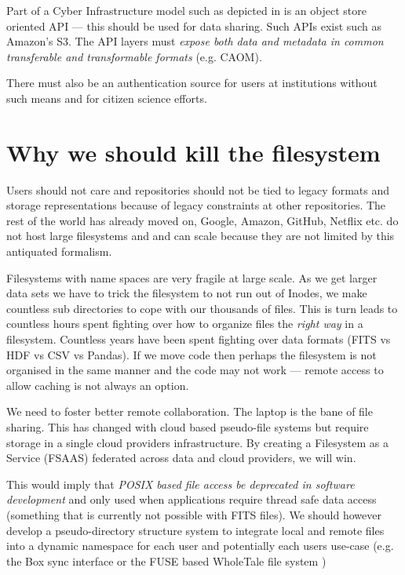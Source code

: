 Part of a Cyber Infrastructure model such as depicted in  is an object store oriented \gls{API} --- this should be used for data sharing. Such APIs exist such as Amazon's S3.
The  \gls{API} layers must \emph{expose both data and \gls{metadata} in common
transferable and transformable formats} (e.g. \gls{CAOM}).


There must also be an authentication source for users at institutions without such means and for citizen science efforts.

\section{Why we should kill the filesystem}

Users should not care and repositories should not be tied to legacy formats  and storage representations because of legacy constraints  at other repositories.
The rest of the world has already moved on,  Google, Amazon, GitHub, Netflix etc. do not host large filesystems and and can scale because they are not limited by this antiquated formalism.

Filesystems with name spaces are very fragile at large scale. As we get larger data sets we have to trick the filesystem to not run out of Inodes, we make countless sub directories to cope with our thousands of files.
This is turn leads to countless hours spent fighting over how to organize files  the \emph{right way} in a filesystem.
Countless years have been spent fighting over data formats (\gls{FITS} vs \gls{HDF} vs \gls{CSV} vs Pandas).
If we move code then perhaps the filesystem is not organised in the same manner and the code may not work --- remote access to allow caching is not always an option.

We need to foster better remote collaboration.  The laptop is the bane of file sharing.
This has changed with cloud based pseudo-file systems but require storage in a single
cloud providers infrastructure. By creating a Filesystem as a Service (\gls{FSAAS}) federated
across data and cloud providers, we will win.

This would imply that \emph{POSIX based file access be deprecated
in software development} and only used when applications require thread safe
data access (something that is currently not possible with \gls{FITS} files).
We should however  develop a pseudo-directory structure system to
integrate local and remote files into a dynamic namespace for each user and potentially
each users use-case (e.g. the Box sync interface or the \gls{FUSE} based WholeTale file system
\citep{BRINCKMAN2019854})

